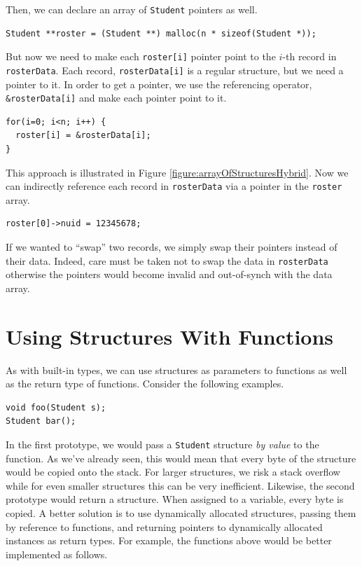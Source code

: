 Then, we can declare an array of \texttt{Student} pointers as well.

\begin{verbatim}
Student **roster = (Student **) malloc(n * sizeof(Student *));
\end{verbatim}

But now we need to make each \texttt{roster[i]} pointer point
to the $i$-th record in \texttt{rosterData}.  Each record, 
\texttt{rosterData[i]} is a regular structure, but we need 
a pointer to it.  In order to get a pointer, we use the referencing
operator, \texttt{&rosterData[i]} and make each pointer point
to it.

\begin{verbatim}
for(i=0; i<n; i++) {
  roster[i] = &rosterData[i];
}
\end{verbatim}

This approach is illustrated in Figure \ref{figure:arrayOfStructuresHybrid}.
Now we can indirectly reference each record in \texttt{rosterData}
via a pointer in the \texttt{roster} array.  

\begin{verbatim}
roster[0]->nuid = 12345678;
\end{verbatim}

If we wanted to ``swap''
two records, we simply swap their pointers instead of their data.  Indeed,
care must be taken not to swap the data in \texttt{rosterData} otherwise
the pointers would become invalid and out-of-synch with the data array.



\section{Using Structures With Functions}

As with built-in types, we can use structures as parameters to functions
as well as the return type of functions.  Consider the following
examples.

\begin{verbatim}
void foo(Student s);
Student bar();
\end{verbatim}

In the first prototype, we would pass a \texttt{Student} structure
\emph{by value} to the function.  As we've already seen, this would
mean that every byte of the structure would be copied onto the stack.
For larger structures, we risk a stack overflow while for even smaller
structures this can be very inefficient.  Likewise, the second prototype
would return a structure.  When assigned to a variable, every byte is
copied.  A better solution is to use dynamically
allocated structures, passing them by reference to functions, and
returning pointers to dynamically allocated instances as return types.
For example, the functions above would be better implemented as follows.

